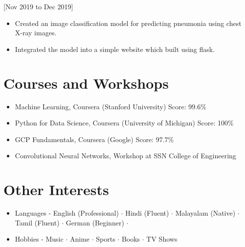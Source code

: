 \documentclass{article}
\begin{document}
[Nov 2019 to Dec 2019]
\begin{itemize}
\item Created an image classification model for predicting pneumonia using chest X-ray images.
\item Integrated the model into a simple website which built using flask.
\end{itemize}

\section{Courses and Workshops}
\begin{itemize}
\item Machine Learning, Coursera (Stanford University) Score: 99.6\%
\item Python for Data Science, Coursera (University of Michigan) Score: 100\%
\item GCP Fundamentals, Coursera (Google) Score: 97.7\%
\item Convolutional Neural Networks, Workshop at SSN College of Engineering
\end{itemize}

\section{Other Interests}
\begin{itemize}
\item Languages - English (Professional) $\cdot$ Hindi (Fluent) $\cdot$ Malayalam (Native) $\cdot$ Tamil (Fluent) $\cdot$ German (Beginner) $\cdot$
\item Hobbies - Music $\cdot$ Anime $\cdot$ Sports $\cdot$ Books $\cdot$ TV Shows
\end{itemize}
\end{document}

